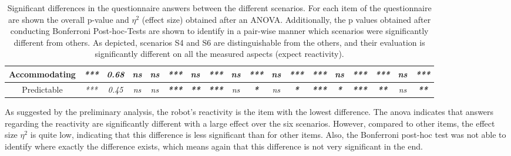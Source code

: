 \begin{sidewaystable}
\begin{tabular}{c|cc|ccccccccccccccc|}
    \multicolumn{1}{|c|}{\textbf{Accommodating}} & \multicolumn{1}{c|}{\textit{***}} & \textit{\textbf{0.68}} & \multicolumn{1}{c|}{\textit{ns}} & \multicolumn{1}{c|}{\textit{ns}} & \multicolumn{1}{c|}{\textit{\textbf{***}}} & \multicolumn{1}{c|}{\textit{ns}}          & \multicolumn{1}{c|}{\textit{\textbf{***}}} & \multicolumn{1}{c|}{\textit{ns}} & \multicolumn{1}{c|}{\textit{\textbf{***}}} & \multicolumn{1}{c|}{\textit{ns}} & \multicolumn{1}{c|}{\textit{\textbf{***}}} & \multicolumn{1}{c|}{\textit{\textbf{***}}} & \multicolumn{1}{c|}{\textit{ns}}         & \multicolumn{1}{c|}{\textit{\textbf{***}}} & \multicolumn{1}{c|}{\textit{\textbf{***}}} & \multicolumn{1}{c|}{\textit{ns}} & \textit{\textbf{***}} \\ \hline
    \multicolumn{1}{|c|}{Predictable}            & \multicolumn{1}{c|}{\textit{***}} & \textit{0.45}          & \multicolumn{1}{c|}{\textit{ns}} & \multicolumn{1}{c|}{\textit{ns}} & \multicolumn{1}{c|}{\textit{\textbf{***}}} & \multicolumn{1}{c|}{\textit{\textbf{**}}} & \multicolumn{1}{c|}{\textit{\textbf{***}}} & \multicolumn{1}{c|}{\textit{ns}} & \multicolumn{1}{c|}{\textit{\textbf{*}}}   & \multicolumn{1}{c|}{\textit{ns}} & \multicolumn{1}{c|}{\textit{\textbf{*}}}   & \multicolumn{1}{c|}{\textit{\textbf{***}}} & \multicolumn{1}{c|}{\textit{\textbf{*}}} & \multicolumn{1}{c|}{\textit{\textbf{***}}} & \multicolumn{1}{c|}{\textit{\textbf{**}}}  & \multicolumn{1}{c|}{\textit{ns}} & \textit{\textbf{**}}  \\ \hline
    \end{tabular}
    \caption{Significant differences in the questionnaire answers between the different scenarios. For each item of the questionnaire are shown the overall p-value and $\eta^2$ (effect size) obtained after an ANOVA. Additionally, the p values obtained after conducting Bonferroni Post-hoc-Tests are shown to identify in a pair-wise manner which scenarios were significantly different from others. As depicted, scenarios S4 and S6 are distinguishable from the others, and their evaluation is significantly different on all the measured aspects (expect reactivity).}
    \label{tab:questionnaire_answers}
\end{sidewaystable}

As suggested by the preliminary analysis, the robot's reactivity is the item with the lowest difference. The \acrshort{anova} indicates that answers regarding the reactivity are significantly different with a large effect over the six scenarios. However, compared to other items, the effect size $\eta^2$ is quite low, indicating that this difference is less significant than for other items. Also, the Bonferroni post-hoc test was not able to identify where exactly the difference exists, which means again that this difference is not very significant in the end. 


